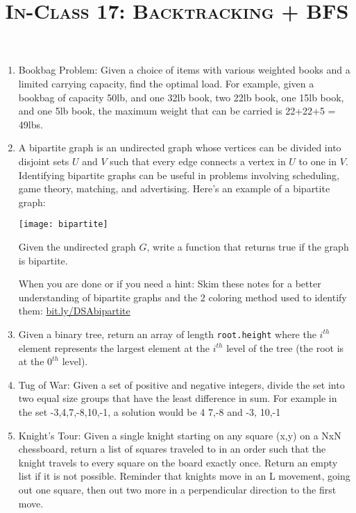 \documentclass{article}
\title{\large{\textsc{In-Class 17: Backtracking + BFS}}}
\date{}
\begin{document}
\maketitle

\subsection*{}


\begin{enumerate}

\item  Bookbag Problem: Given a choice of items with
various weighted books and a limited carrying capacity,
find the optimal load. For example, given a bookbag of capacity 50lb, and one 32lb book, two 22lb book, one 15lb book, and one 5lb book, the maximum weight that can be carried is 22+22+5 = 49lbs.

\item A bipartite graph is an undirected graph whose vertices can be divided into disjoint sets $U$ and $V$ such that every edge connects a vertex in $U$ to one in $V$.  Identifying bipartite graphs can be useful in problems involving scheduling, game theory, matching, and advertising. Here's an example of a bipartite graph:

\centerline{\texttt{[image: bipartite]}}

Given the undirected graph $G$, write a function that returns true if the graph is bipartite.

When you are done or if you need a hint: Skim these notes for a better understanding of bipartite graphs and the 2 coloring method used to identify them: \href{bit.ly/DSAbipartite}{bit.ly/DSAbipartite}

\item Given a binary tree, return an array of length \texttt{root.height} where the $i^{th}$ element represents the largest element at the $i^{th}$ level of the tree (the root is at the $0^{th}$ level).

\item Tug of War: Given a set of positive and negative integers, divide the set into two equal size groups that have the least difference in sum. For example in the set {-3,4,7,-8,10,-1}, a solution would be {4 7,-8} and { -3, 10,-1}

\item Knight's Tour: Given a single knight starting on any square (x,y) on a NxN chessboard, return a list of squares traveled to in an order such that the knight travels to every square on the board exactly once. Return an empty list if it is not possible. Reminder that knights move in an L movement, going out one square, then out two more in a perpendicular direction to the first move.


\end{enumerate}
\end{document}
